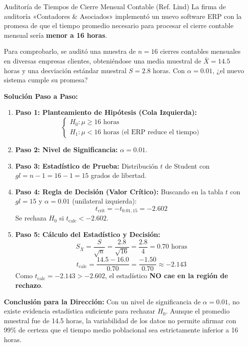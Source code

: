 \begin{casocontable}{Auditoría de Tiempos de Cierre Mensual Contable (Ref. Lind)}
La firma de auditoría «Contadores & Asociados» implementó un nuevo software ERP con la promesa de que el tiempo promedio necesario para procesar el cierre contable mensual sería \textbf{menor a 16 horas}. 

Para comprobarlo, se auditó una muestra de $n = 16$ cierres contables mensuales en diversas empresas clientes, obteniéndose una media muestral de $\bar{X} = 14.5$ horas y una desviación estándar muestral $S = 2.8$ horas. Con $\alpha = 0.01$, ¿el nuevo sistema cumple su promesa?

\tcbline
\textbf{Solución Paso a Paso:}
\begin{enumerate}
    \item \textbf{Paso 1: Planteamiento de Hipótesis (Cola Izquierda):}
    \[
    \begin{cases} H_0: \mu \ge 16 \text{ horas} \\ H_1: \mu < 16 \text{ horas} \text{ (el ERP reduce el tiempo)} \end{cases}
    \]
    
    \item \textbf{Paso 2: Nivel de Significancia:} $\alpha = 0.01$.
    
    \item \textbf{Paso 3: Estadístico de Prueba:}
    Distribución $t$ de Student con $gl = n - 1 = 16 - 1 = 15$ grados de libertad.
    
    \item \textbf{Paso 4: Regla de Decisión (Valor Crítico):}
    Buscando en la tabla $t$ con $gl = 15$ y $\alpha = 0.01$ (unilateral izquierda):
    \[
    t_{\text{crit}} = -t_{0.01, 15} = -2.602
    \]
    Se rechaza $H_0$ si $t_{\text{calc}} < -2.602$.
    
    \item \textbf{Paso 5: Cálculo del Estadístico y Decisión:}
    \[
    S_{\bar{X}} = \frac{S}{\sqrt{n}} = \frac{2.8}{\sqrt{16}} = \frac{2.8}{4} = 0.70 \text{ horas}
    \]
    \[
    t_{\text{calc}} = \frac{14.5 - 16.0}{0.70} = \frac{-1.50}{0.70} \approx -2.143
    \]
    Como $t_{\text{calc}} = -2.143 > -2.602$, el estadístico \textbf{NO cae en la región de rechazo}.
\end{enumerate}

\textbf{Conclusión para la Dirección:} Con un nivel de significancia de $\alpha = 0.01$, no existe evidencia estadística suficiente para rechazar $H_0$. Aunque el promedio muestral fue de 14.5 horas, la variabilidad de los datos no permite afirmar con 99\% de certeza que el tiempo medio poblacional sea estrictamente inferior a 16 horas.
\end{casocontable}


